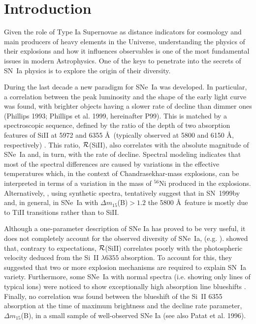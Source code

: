 \documentclass[preprint2]{aastex}
\newcommand{\dm}{$\Delta m_{15}$(B)}
\begin{document}


\section{Introduction}\label{intro}

Given the role of Type Ia Supernovae as distance indicators for cosmology and
main producers of heavy elements in the Universe, understanding the physics
of their explosions and how it influences observables is one of the most
fundamental issues in modern Astrophysics.  One of the keys to penetrate into 
the secrets of SN~Ia physics is to explore the origin of their diversity.

During the last decade a new paradigm for SNe~Ia was developed. In
particular, a correlation between the peak luminosity and the shape of
the early light curve was found, with brighter objects having a slower
rate of decline than dimmer ones (Phillips 1993; Phillips et al. 1999,
hereinafter P99). This is matched by a spectroscopic sequence, defined
by the ratio of the depth of two absorption features of SiII at 5972 and 6355
\AA\ (typically observed at 5800 and 6150 \AA, respectively)
\citep{nug95}. This ratio, $\cal R$(SiII), also correlates with the
absolute magnitude of SNe~Ia and, in turn, with the rate of
decline. Spectral modeling indicates that most of the spectral
differences are caused by variations in the effective temperatures
which, in the context of Chandrasekhar-mass explosions, can be
interpreted in terms of a variation in the mass of $^{56}$Ni produced
in the explosions.\\
Alternatively, \citet{gar04}, using synthetic spectra, 
tentatively suggest that in SN~1999by and, in general,
in SNe~Ia with \dm$>1.2$ the 5800 \AA\ feature is
mostly due to TiII transitions rather than to SiII.

Although a one-parameter description of SNe Ia has proved to be very
useful, it does not completely account for the observed diversity of
SNe~Ia, (e.g.  \citep{ben04,pig04}). \cite{hat00} showed that,
contrary to expectations, $\cal R$(SiII) correlates poorly with the
photospheric velocity deduced from the Si~II $\lambda 6355$
absorption. To account for this, they suggested that two or more
explosion mechanisms are required to explain SN~Ia variety.
Furthermore, some SNe~Ia with normal spectra (i.e. showing only lines
of typical ions) were noticed to show exceptionally high absorption
line blueshifts \citep{bra87}.  Finally, no correlation was found
between the blueshift of the Si~II 6355 absorption at the time of
maximum brightness and the decline rate parameter, \dm, in a small
sample of well-observed SNe Ia (see also Patat et al.  1996).
\end{document}

